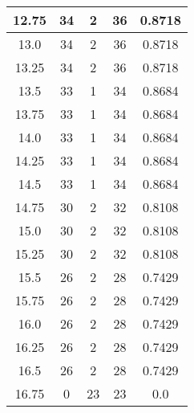 \documentclass[letterpaper, 12pt]{article}
\begin{document}
\begin{longtable}{|c|c|c|c|c|}
\hline
12.75 & 34 & 2 & 36 & 0.8718 \\
\hline
13.0 & 34 & 2 & 36 & 0.8718 \\
\hline
13.25 & 34 & 2 & 36 & 0.8718 \\
\hline
13.5 & 33 & 1 & 34 & 0.8684 \\
\hline
13.75 & 33 & 1 & 34 & 0.8684 \\
\hline
14.0 & 33 & 1 & 34 & 0.8684 \\
\hline
14.25 & 33 & 1 & 34 & 0.8684 \\
\hline
14.5 & 33 & 1 & 34 & 0.8684 \\
\hline
14.75 & 30 & 2 & 32 & 0.8108 \\
\hline
15.0 & 30 & 2 & 32 & 0.8108 \\
\hline
15.25 & 30 & 2 & 32 & 0.8108 \\
\hline
15.5 & 26 & 2 & 28 & 0.7429 \\
\hline
15.75 & 26 & 2 & 28 & 0.7429 \\
\hline
16.0 & 26 & 2 & 28 & 0.7429 \\
\hline
16.25 & 26 & 2 & 28 & 0.7429 \\
\hline
16.5 & 26 & 2 & 28 & 0.7429 \\
\hline
16.75 & 0 & 23 & 23 & 0.0 \\
\hline
\end{longtable}
\end{document}
